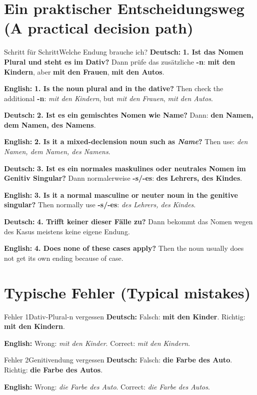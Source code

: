 \documentclass[a4paper,11pt]{article}
\newcommand{\GermanText}[1]{\textbf{Deutsch: }#1\par}
\newcommand{\EnglishText}[1]{{\small\color{SoftGray}\textbf{English: }#1\par}}
\begin{document}
\section{Ein praktischer Entscheidungsweg \textnormal{(A practical decision path)}}
\begin{grammarentry}{Schritt für Schritt}{Welche Endung brauche ich?}
\GermanText{\textbf{1. Ist das Nomen Plural und steht es im Dativ?} Dann prüfe das zusätzliche \textbf{-n}: \textbf{mit den Kindern}, aber \textbf{mit den Frauen}, \textbf{mit den Autos}.}
\EnglishText{\textbf{1. Is the noun plural and in the dative?} Then check the additional \textbf{-n}: \emph{mit den Kindern}, but \emph{mit den Frauen}, \emph{mit den Autos}.}

\GermanText{\textbf{2. Ist es ein gemischtes Nomen wie \glqq Name\grqq?} Dann: \textbf{den Namen, dem Namen, des Namens}.}
\EnglishText{\textbf{2. Is it a mixed-declension noun such as \emph{Name}?} Then use: \emph{den Namen, dem Namen, des Namens}.}

\GermanText{\textbf{3. Ist es ein normales maskulines oder neutrales Nomen im Genitiv Singular?} Dann normalerweise \textbf{-s/-es}: \textbf{des Lehrers, des Kindes}.}
\EnglishText{\textbf{3. Is it a normal masculine or neuter noun in the genitive singular?} Then normally use \textbf{-s/-es}: \emph{des Lehrers, des Kindes}.}

\GermanText{\textbf{4. Trifft keiner dieser Fälle zu?} Dann bekommt das Nomen wegen des Kasus meistens keine eigene Endung.}
\EnglishText{\textbf{4. Does none of these cases apply?} Then the noun usually does not get its own ending because of case.}
\end{grammarentry}

\section{Typische Fehler \textnormal{(Typical mistakes)}}


\begin{grammarentry}{Fehler 1}{Dativ-Plural-n vergessen}
\GermanText{Falsch: \textbf{mit den Kinder}. Richtig: \textbf{mit den Kindern}.}
\EnglishText{Wrong: \emph{mit den Kinder}. Correct: \emph{mit den Kindern}.}
\end{grammarentry}

\begin{grammarentry}{Fehler 2}{Genitivendung vergessen}
\GermanText{Falsch: \textbf{die Farbe des Auto}. Richtig: \textbf{die Farbe des Autos}.}
\EnglishText{Wrong: \emph{die Farbe des Auto}. Correct: \emph{die Farbe des Autos}.}
\end{grammarentry}
\end{document}
